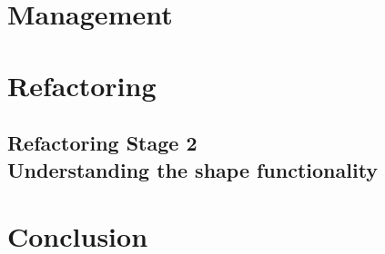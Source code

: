 \documentclass{article}
\begin{document}
\section{Management}

\section{Refactoring}



\subsection[Section Title. Section Subtitle]{Refactoring Stage 2\\ {\large Understanding the shape functionality}}


\newpage
\section{Conclusion}
\end{document}
